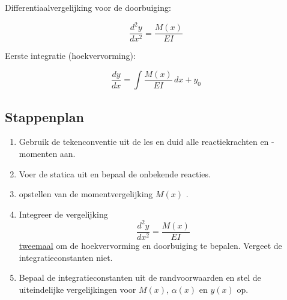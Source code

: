 \documentclass[a4paper,11pt]{article}
\begin{document}
\vspace{1.2cm}

\noindent
\begin{minipage}[t]{0.47\textwidth}
\noindent Differentiaalvergelijking voor de doorbuiging:

\vspace{0.8em}

\begin{equation}
\frac{d^2 y}{dx^2} = \frac{M(x)}{EI}
\end{equation}
\end{minipage}
\hfill
\begin{minipage}[t]{0.47\textwidth}
\noindent Eerste integratie (hoekvervorming):

\vspace{0.8em}

\begin{equation}
\frac{dy}{dx} = \int \frac{M(x)}{EI} \, dx + y_0
\end{equation}
\end{minipage}
\vspace{.8cm}

\subsection*{Stappenplan}

\begin{enumerate}
    \item Gebruik de tekenconventie uit de les en duid alle reactiekrachten en -momenten aan.
    
    \item Voer de statica uit en bepaal de onbekende reacties.
    
    \item opstellen van de momentvergelijking $M(x)$ .
    
    \item Integreer de vergelijking 
    \[
    \frac{d^2 y}{dx^2} = \frac{M(x)}{EI}
    \]
    \underline{tweemaal} om de hoekvervorming en doorbuiging te bepalen. Vergeet de integratieconstanten niet.
    
    \item Bepaal de integratieconstanten uit de randvoorwaarden en stel de uiteindelijke vergelijkingen voor $M(x)$, $\alpha(x)$ en $y(x)$ op.
\end{enumerate}


\newpage
\end{document}
